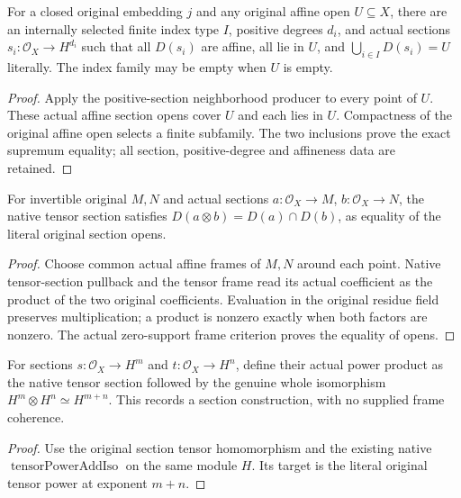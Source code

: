 \begin{lemma}
\label{lem:proj-affine-finite-positive-refinement}
\leanok
For a closed original embedding $j$ and any original affine open
$U\subseteq X$, there are an internally selected finite index type
$I$, positive degrees $d_i$, and actual sections
$s_i:\mathcal O_X\to H^{d_i}$ such that all $D(s_i)$ are affine,
all lie in $U$, and $\bigcup_{i\in I}D(s_i)=U$ literally.
The index family may be empty when $U$ is empty.
\end{lemma}
\begin{proof}
Apply the positive-section neighborhood producer to every point of
$U$. These actual affine section opens cover $U$ and each lies in
$U$. Compactness of the original affine open selects a finite
subfamily. The two inclusions prove the exact supremum equality;
all section, positive-degree and affineness data are retained.
\end{proof}

\begin{lemma}
\label{lem:proj-affine-tensor-section-open}
\leanok
For invertible original $M,N$ and actual sections
$a:\mathcal O_X\to M$, $b:\mathcal O_X\to N$, the native tensor
section satisfies $D(a\otimes b)=D(a)\cap D(b)$, as equality of the
literal original section opens.
\end{lemma}
\begin{proof}
Choose common actual affine frames of $M,N$ around each point.
Native tensor-section pullback and the tensor frame read its actual
coefficient as the product of the two original coefficients.
Evaluation in the original residue field preserves multiplication;
a product is nonzero exactly when both factors are nonzero.
The actual zero-support frame criterion proves the equality of opens.
\end{proof}

\begin{definition}
\label{def:proj-affine-power-product}
\leanok
For sections $s:\mathcal O_X\to H^m$ and
$t:\mathcal O_X\to H^n$, define their actual power product as the
native tensor section followed by the genuine whole isomorphism
$H^m\otimes H^n\simeq H^{m+n}$.
This records a section construction, with no supplied frame coherence.
\end{definition}
\begin{proof}
Use the original section tensor homomorphism and the existing native
$\operatorname{tensorPowerAddIso}$ on the same module $H$.
Its target is the literal original tensor power at exponent $m+n$.
\end{proof}

